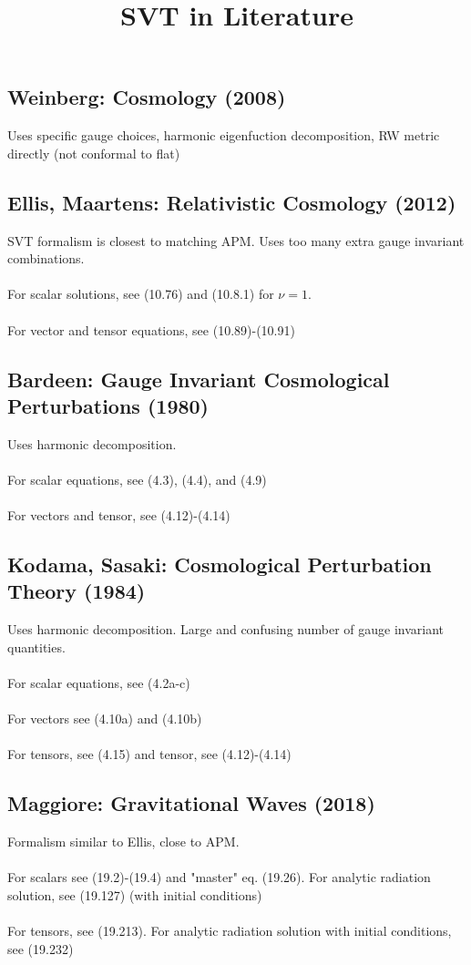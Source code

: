 \documentclass[10pt,letterpaper]{article}
\title{SVT in Literature}
\date{}
\numberwithin{equation}{section}
\begin{document}
 
\maketitle
\noindent 
\subsection{Weinberg: Cosmology (2008)}
 Uses specific gauge choices, harmonic eigenfuction decomposition, RW metric directly (not conformal to flat)

\subsection{Ellis, Maartens: Relativistic Cosmology (2012)}
SVT formalism is closest to matching APM. Uses too many extra gauge invariant combinations. 
\\ \\
For scalar solutions, see (10.76) and (10.8.1) for $\nu =1$. 
\\ \\
For vector and tensor equations, see (10.89)-(10.91)

\subsection{Bardeen: Gauge Invariant Cosmological Perturbations (1980)}
Uses harmonic decomposition. 
\\ \\
For scalar equations, see (4.3), (4.4), and (4.9)
\\ \\
For vectors and tensor, see (4.12)-(4.14)

\subsection{Kodama, Sasaki: Cosmological Perturbation Theory (1984)}
Uses harmonic decomposition. Large and confusing number of gauge invariant quantities.
\\ \\
For scalar equations, see (4.2a-c)
\\ \\
For vectors see (4.10a) and (4.10b)
\\ \\
For tensors, see (4.15)
 and tensor, see (4.12)-(4.14)
 
\subsection{Maggiore: Gravitational Waves (2018)}
Formalism similar to Ellis, close to APM. 
\\ \\
For scalars see (19.2)-(19.4) and "master" eq. (19.26). For analytic radiation solution, see (19.127) (with initial conditions)
\\ \\
For tensors, see (19.213). For analytic radiation solution with initial conditions, see (19.232)
\end{document}
